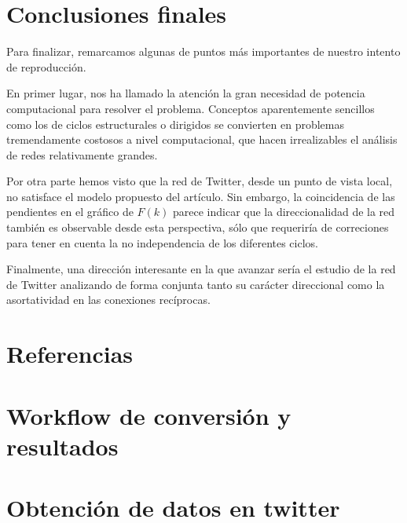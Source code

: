 \documentclass[1p]{elsarticle}
\begin{document}
\section{Conclusiones finales}
    Para finalizar, remarcamos algunas de puntos más importantes de nuestro intento de reproducción.

    En primer lugar, nos ha llamado la atención la gran necesidad de potencia computacional para resolver el problema. 
    Conceptos aparentemente sencillos como los de ciclos estructurales o dirigidos se convierten en problemas tremendamente costosos a nivel computacional, que hacen irrealizables el análisis de redes relativamente grandes.

    Por otra parte hemos visto que la red de Twitter, desde un punto de vista local, no satisface el modelo propuesto del artículo. Sin embargo, la coincidencia de las pendientes en el gráfico de $F(k)$ parece indicar que la direccionalidad de la red también es observable desde esta perspectiva, sólo que requeriría de correciones para tener en cuenta la no independencia de los diferentes ciclos.

    Finalmente, una dirección interesante en la que avanzar sería el estudio de la red de Twitter analizando de forma conjunta tanto su carácter direccional como la asortatividad en las conexiones recíprocas.

\section*{Referencias}


\begin{appendices}
	
	\section{Workflow de conversión y resultados}
	
\pagebreak
\section{Obtención de datos en twitter}

\end{appendices}
\end{document}
